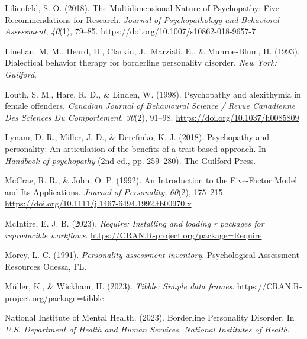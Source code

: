 \documentclass[
  man,floatsintext]{apa7}
\newlength{\cslhangindent}
\newlength{\cslentryspacingunit} %
\newenvironment{CSLReferences}[2] %
 {%
  \setlength{\parindent}{0pt}
  \ifodd #1
  \let\oldpar\par
  \def\par{\hangindent=\cslhangindent\oldpar}
  \fi
  \setlength{\parskip}{#2\cslentryspacingunit}
 }%
 {}
\begin{document}
\begin{CSLReferences}{1}{0}
\leavevmode{}%
Lilienfeld, S. O. (2018). The {Multidimensional Nature} of {Psychopathy}: {Five Recommendations} for {Research}. \emph{Journal of Psychopathology and Behavioral Assessment}, \emph{40}(1), 79--85. \url{https://doi.org/10.1007/s10862-018-9657-7}

\leavevmode{}%
Linehan, M. M., Heard, H., Clarkin, J., Marziali, E., \& Munroe-Blum, H. (1993). Dialectical behavior therapy for borderline personality disorder. \emph{New York: Guilford}.

\leavevmode{}%
Louth, S. M., Hare, R. D., \& Linden, W. (1998). Psychopathy and alexithymia in female offenders. \emph{Canadian Journal of Behavioural Science / Revue Canadienne Des Sciences Du Comportement}, \emph{30}(2), 91--98. \url{https://doi.org/10.1037/h0085809}

\leavevmode{}%
Lynam, D. R., Miller, J. D., \& Derefinko, K. J. (2018). Psychopathy and personality: {An} articulation of the benefits of a trait-based approach. In \emph{Handbook of psychopathy} (2nd ed., pp. 259--280). {The Guilford Press}.

\leavevmode{}%
McCrae, R. R., \& John, O. P. (1992). An {Introduction} to the {Five}-{Factor Model} and {Its Applications}. \emph{Journal of Personality}, \emph{60}(2), 175--215. \url{https://doi.org/10.1111/j.1467-6494.1992.tb00970.x}

\leavevmode{}%
McIntire, E. J. B. (2023). \emph{Require: Installing and loading r packages for reproducible workflows}. \url{https://CRAN.R-project.org/package=Require}

\leavevmode{}%
Morey, L. C. (1991). \emph{Personality assessment inventory}. Psychological Assessment Resources Odessa, FL.

\leavevmode{}%
Müller, K., \& Wickham, H. (2023). \emph{Tibble: Simple data frames}. \url{https://CRAN.R-project.org/package=tibble}

\leavevmode{}%
National Institute of Mental Health. (2023). Borderline {Personality Disorder}. In \emph{U.S. Department of Health and Human Services, National Institutes of Health}.


\end{CSLReferences}
\end{document}

